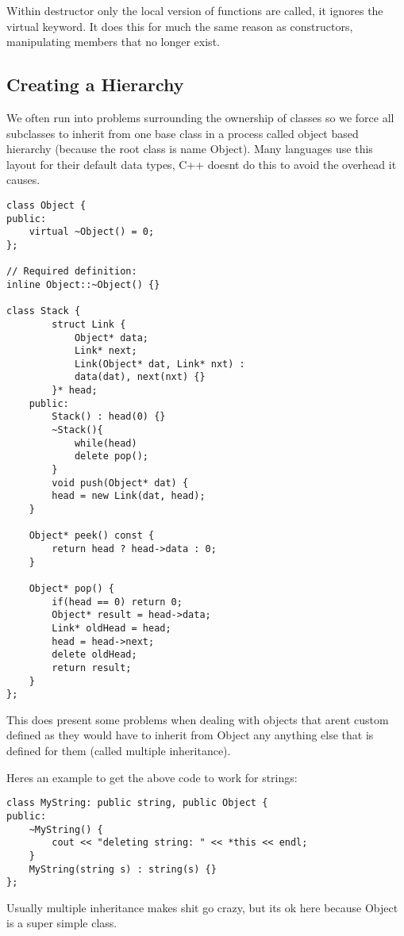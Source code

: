 \documentclass[12pt]{article}
\begin{document}
Within destructor only the local version of functions are called, it ignores the virtual keyword. It does this for much the same reason as constructors, manipulating members that no longer exist.

\subsection*{Creating a Hierarchy}
We often run into problems surrounding the ownership of classes so we force all subclasses to inherit from one base class in a process called object based hierarchy (because the root class is name Object). Many languages use this layout for their default data types, C++ doesnt do this to avoid the overhead it causes.

\begin{lstlisting}
class Object {
public:
    virtual ~Object() = 0;
};

// Required definition:
inline Object::~Object() {}

class Stack {
        struct Link {
            Object* data;
            Link* next;
            Link(Object* dat, Link* nxt) :
            data(dat), next(nxt) {}
        }* head;
    public:
        Stack() : head(0) {}
        ~Stack(){
            while(head)
            delete pop();
        }
        void push(Object* dat) {
        head = new Link(dat, head);
    }

    Object* peek() const {
        return head ? head->data : 0;
    }

    Object* pop() {
        if(head == 0) return 0;
        Object* result = head->data;
        Link* oldHead = head;
        head = head->next;
        delete oldHead;
        return result;
    }
};
\end{lstlisting}

This does present some problems when dealing with objects that arent custom defined as they would have to inherit from Object any anything else that is defined for them (called multiple inheritance).

Heres an example to get the above code to work for strings:
\begin{lstlisting}
class MyString: public string, public Object {
public:
    ~MyString() {
        cout << "deleting string: " << *this << endl;
    }
    MyString(string s) : string(s) {}
};
\end{lstlisting}

Usually multiple inheritance makes shit go crazy, but its ok here because Object is a super simple class.
\end{document}
